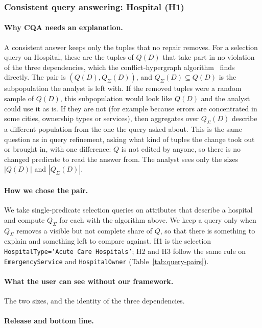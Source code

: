 \subsubsection{Consistent query answering: Hospital (H1)}
\label{subsec:case-cqa}

\paragraph{Why CQA needs an explanation.}
A consistent answer keeps only the tuples that no repair removes. For a selection query on Hospital, these are the tuples of $Q(D)$ that take part in no violation of the three dependencies, which the conflict-hypergraph algorithm~\cite{chomicki2004} finds directly. The pair is $(Q(D),Q_\Sigma(D))$, and $Q_\Sigma(D)\subseteq Q(D)$ is the subpopulation the analyst is left with.
If the removed tuples were a random sample of $Q(D)$, this subpopulation would look like $Q(D)$ and the analyst could use it as is. If they are not (for example because errors are concentrated in some cities, ownership types or services), then aggregates over $Q_\Sigma(D)$ describe a different population from the one the query asked about.
This is the same question as in query refinement, asking what kind of tuples the change took out or brought in, with one difference: $Q$ is not edited by anyone, so there is no changed predicate to read the answer from. The analyst sees only the sizes $|Q(D)|$ and $|Q_\Sigma(D)|$.

\paragraph{How we chose the pair.}
We take single-predicate selection queries on attributes that describe a hospital and compute $Q_\Sigma$ for each with the algorithm above. We keep a query only when $Q_\Sigma$ removes a visible but not complete share of $Q$, so that there is something to explain and something left to compare against. H1 is the selection \texttt{HospitalType='Acute Care Hospitals'}; H2 and H3 follow the same rule on \texttt{EmergencyService} and \texttt{HospitalOwner} (Table~\ref{tab:query-pairs}).

\paragraph{What the user can see without our framework.}
The two sizes, and the identity of the three dependencies.

\paragraph{Release and bottom line.}

